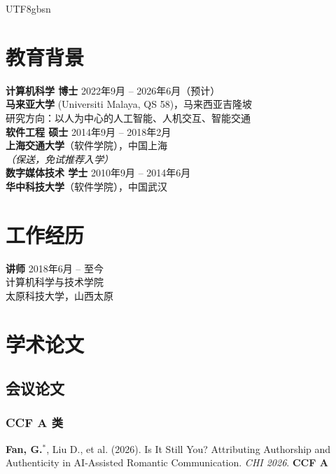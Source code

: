 \documentclass[a4paper,10pt]{article}
\newcommand{\pubitem}[1]{\item #1}
\begin{document}
\begin{CJK*}{UTF8}{gbsn}
\section*{教育背景}

\noindent
\textbf{计算机科学 博士} \hfill 2022年9月 -- 2026年6月（预计）\\
\textbf{马来亚大学} (Universiti Malaya, QS 58)，马来西亚吉隆坡 \\
研究方向：以人为中心的人工智能、人机交互、智能交通 \\

\noindent
\textbf{软件工程 硕士} \hfill 2014年9月 -- 2018年2月 \\
\textbf{上海交通大学}（软件学院），中国上海 \\
\textit{（保送，免试推荐入学）} \\

\noindent
\textbf{数字媒体技术 学士} \hfill 2010年9月 -- 2014年6月 \\
\textbf{华中科技大学}（软件学院），中国武汉

\section*{工作经历}

\noindent
\textbf{讲师} \hfill 2018年6月 -- 至今 \\
计算机科学与技术学院 \\
太原科技大学，山西太原

\section*{学术论文\footnotemark[1]}

\subsection*{会议论文}

\subsubsection*{CCF A 类}

\begin{enumerate}[label={[C\arabic*]}]
    \pubitem{\textbf{Fan, G.}$^*$, Liu D., et al. (2026). Is It Still You? Attributing Authorship and Authenticity in AI-Assisted Romantic Communication. \textit{CHI 2026}. \textbf{CCF A}}
    

\end{enumerate}
\end{CJK*}
\end{document}
